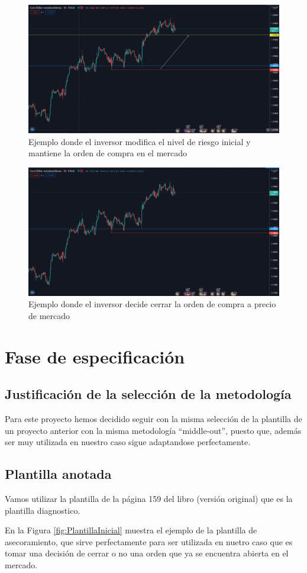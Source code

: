 \begin{figure}[H]
  \centering
  \includegraphics[scale=0.30]{imagenes/Situacion12.png}
  \caption{\label{fig:Situacion12}Ejemplo donde el inversor modifica el nivel de riesgo inicial y mantiene la orden de compra en el mercado}
\end{figure}
\begin{figure}[H]
  \centering
  \includegraphics[scale=0.30]{imagenes/Situacion1.png}
  \caption{\label{fig:Situacion2}Ejemplo donde el inversor decide cerrar la orden de compra a precio de mercado}
\end{figure}
\section{Fase de especificación}
\subsection{Justificación de la selección de la metodología}
Para este proyecto hemos decidido seguir con la misma selección de la plantilla de un proyecto anterior con la misma metodología ``middle-out'', puesto que, además ser muy utilizada en nuestro caso sigue adaptandose perfectamente. 

\subsection{Plantilla anotada}

Vamos utilizar la plantilla de la página 159 del libro (versión original) que es la plantilla diagnostico.

En la Figura \ref{fig:PlantillaInicial} muestra el ejemplo de la plantilla de asecoramiento, que sirve perfectamente para ser utilizada en nuetro caso que es tomar una decisión de cerrar o no una orden que ya se encuentra abierta en el mercado.